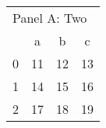 \begin{tabular}{lccc}
\toprule
\multicolumn{4}{l}{Panel A: Two}\\
  & a & b & c\\
\midrule
0 & 11 & 12 & 13 \\
1 & 14 & 15 & 16 \\
2 & 17 & 18 & 19 \\
\bottomrule

\end{tabular}